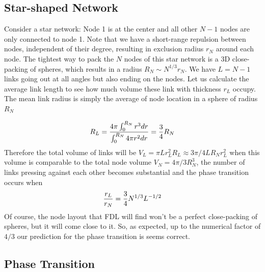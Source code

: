 \documentclass[11pt]{article}
\begin{document}
\subsection{Star-shaped Network}
Consider a star network: 
Node 1 is at the center and all other $N-1$ nodes are only connected to node 1. 
Note that we have a short-range repulsion between nodes, independent of their degree, resulting in exclusion radius $r_N$ around each node. 
The tightest way to pack the $N$ nodes of this star network is a 3D close-packing of spheres, which results in a radius $R_N\sim N^{1/3}r_N$.
We have $L=N-1$ links going out at all angles but also ending on the nodes.
Let us calculate the average link length to see how much volume these link with thickness $r_L$ occupy. 
The mean link radius is simply the average of node location in a sphere of radius $R_N$ 

\begin{align}
    R_L =  \frac{4\pi \int_0^{R_N} r^3dr }{\int_0^{R_N} 4\pi r^2 dr} = {3\over 4} R_N
    \label{eq:RL}
\end{align}
Therefore the total volume of links will be $V_L = \pi L r_L^2 R_L \approx 3\pi/4 L R_N r_L^2 $ when this volume is comparable to the total node volume $V_N = 4\pi/3 R_N^3$, the number of links pressing against each other becomes substantial and the phase transition occurs when
%
\[ {r_L\over r_N} = {3\over 4} N^{1/3}L^{-1/2}\]
%
Of course, the node layout that FDL will find won't be a perfect close-packing of spheres, but it will come close to it.
So, as expected, up to the numerical factor of $4/3$ our prediction for the phase transition is seems correct.


\subsection{Phase Transition}
\end{document}
